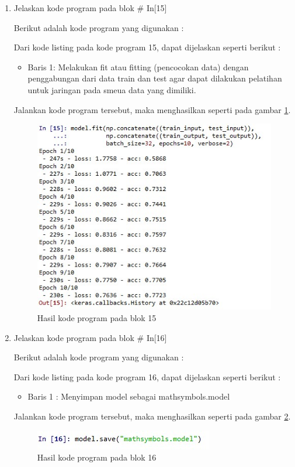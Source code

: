 \begin{enumerate}
\item Jelaskan kode program pada blok \# In[15]
\par Berikut adalah kode program yang digunakan :
	
	\par Dari kode listing pada kode program 15, dapat dijelaskan seperti berikut :
	\begin{itemize}
	\item Baris 1: Melakukan fit atau fitting (pencocokan data) dengan penggabungan dari data train dan test agar dapat dilakukan pelatihan untuk jaringan pada smeua data yang dimiliki.
	\end{itemize}
	\par Jalankan kode program tersebut, maka menghasilkan seperti pada gambar \ref{andri15}.
		\begin{figure}[!hbtp]
		\centering
		\includegraphics[scale=0.5]{figures/chapter7/andri15.jpg}
		\caption{Hasil kode program pada blok 15}
		\label{andri15}
		\end{figure}

\item Jelaskan kode program pada blok \# In[16]
\par Berikut adalah kode program yang digunakan :
	
	\par Dari kode listing pada kode program 16, dapat dijelaskan seperti berikut :
	\begin{itemize}
	\item Baris 1	: Menyimpan model sebagai mathsymbols.model
	\end{itemize}
	\par Jalankan kode program tersebut, maka menghasilkan seperti pada gambar \ref{andri16}.
		\begin{figure}[!hbtp]
		\centering
		\includegraphics[scale=0.5]{figures/chapter7/andri16.jpg}
		\caption{Hasil kode program pada blok 16}
		\label{andri16}
		\end{figure}


\end{enumerate}
